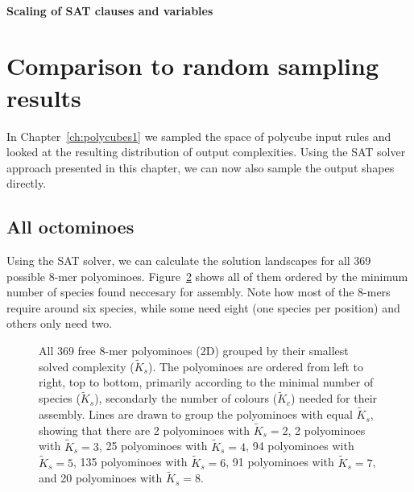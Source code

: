 \paragraph{Scaling of SAT clauses and variables}

\begin{figure}[ht]
    \centering
    
    \caption{}
    \label{fig:SAT_scaling}
\end{figure}



\section{Comparison to random sampling results}
In Chapter~\ref{ch:polycubes1} we sampled the space of polycube input rules and looked at the resulting distribution of output complexities. Using the SAT solver approach presented in this chapter, we can now also sample the output shapes directly. 

\subsection{All octominoes}
Using the SAT solver, we can calculate the solution landscapes for all 369 possible 8-mer polyominoes. Figure~\ref*{fig:8-mers_grid} shows all of them ordered by the minimum number of species found neccesary for assembly. Note how most of the 8-mers require around six species, while some need eight (one species per position) and others only need two.

\begin{figure}[ht]
    \centering
    
    \caption{All 369 free 8-mer polyominoes (2D) grouped by their smallest solved complexity (\(\widetilde{K}_s\)). The polyominoes are ordered from left to right, top to bottom, primarily according to the minimal number of species (\(\widetilde{K}_s\)), secondarly the number of colours (\(\widetilde{K}_c\)) needed for their assembly. Lines are drawn to group the polyominoes with equal \(\widetilde{K}_s\), showing that there are 
    2 polyominoes with \(\widetilde{K}_s=2\),
    2 polyominoes with \(\widetilde{K}_s=3\),
    25 polyominoes with \(\widetilde{K}_s=4\),
    94 polyominoes with \(\widetilde{K}_s=5\),
    135 polyominoes with \(\widetilde{K}_s=6\),
    91 polyominoes with \(\widetilde{K}_s=7\), and
    20 polyominoes with \(\widetilde{K}_s=8\).
    }
    \label{fig:8-mers_grid}
\end{figure}

